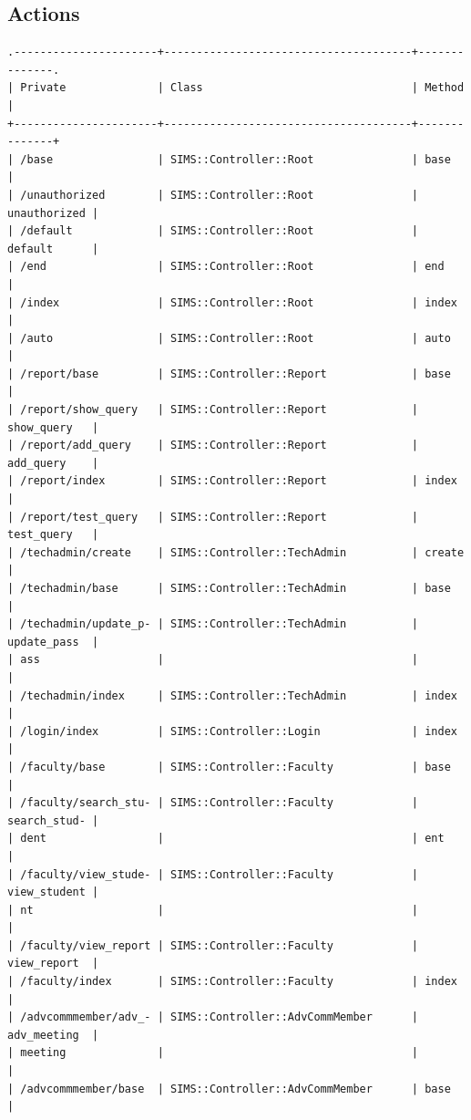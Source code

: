 \documentclass{journal}
\begin{document}
\subsection{Actions}

\begin{verbatim}
.----------------------+--------------------------------------+--------------.
| Private              | Class                                | Method       |
+----------------------+--------------------------------------+--------------+
| /base                | SIMS::Controller::Root               | base         |
| /unauthorized        | SIMS::Controller::Root               | unauthorized |
| /default             | SIMS::Controller::Root               | default      |
| /end                 | SIMS::Controller::Root               | end          |
| /index               | SIMS::Controller::Root               | index        |
| /auto                | SIMS::Controller::Root               | auto         |
| /report/base         | SIMS::Controller::Report             | base         |
| /report/show_query   | SIMS::Controller::Report             | show_query   |
| /report/add_query    | SIMS::Controller::Report             | add_query    |
| /report/index        | SIMS::Controller::Report             | index        |
| /report/test_query   | SIMS::Controller::Report             | test_query   |
| /techadmin/create    | SIMS::Controller::TechAdmin          | create       |
| /techadmin/base      | SIMS::Controller::TechAdmin          | base         |
| /techadmin/update_p- | SIMS::Controller::TechAdmin          | update_pass  |
| ass                  |                                      |              |
| /techadmin/index     | SIMS::Controller::TechAdmin          | index        |
| /login/index         | SIMS::Controller::Login              | index        |
| /faculty/base        | SIMS::Controller::Faculty            | base         |
| /faculty/search_stu- | SIMS::Controller::Faculty            | search_stud- |
| dent                 |                                      | ent          |
| /faculty/view_stude- | SIMS::Controller::Faculty            | view_student |
| nt                   |                                      |              |
| /faculty/view_report | SIMS::Controller::Faculty            | view_report  |
| /faculty/index       | SIMS::Controller::Faculty            | index        |
| /advcommmember/adv_- | SIMS::Controller::AdvCommMember      | adv_meeting  |
| meeting              |                                      |              |
| /advcommmember/base  | SIMS::Controller::AdvCommMember      | base         |

\end{verbatim}
\end{document}
